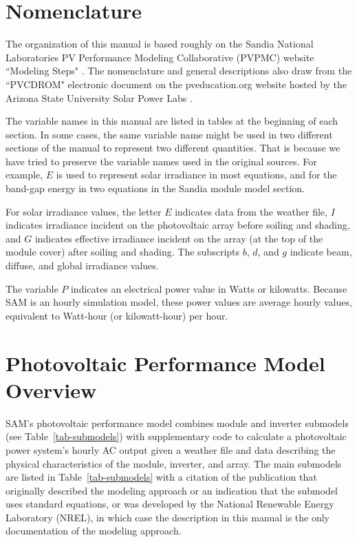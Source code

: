 \documentclass[12pt,letterpaper]{article}
\begin{document}
\mainmatter
\tableofcontents
\listoffigures
\listoftables

\chapter{Nomenclature}

The organization of this manual is based roughly on the Sandia National Laboratories PV Performance Modeling Collaborative (PVPMC) website ``Modeling Steps" \citep{pvpmc}. The nomenclature and general descriptions also draw from the ``PVCDROM" electronic document on the pveducation.org website hosted by the Arizona State University Solar Power Labs \citep{pvcdrom}.

The variable names in this manual are listed in tables at the beginning of each section. In some cases, the same variable name might be used in two different sections of the manual to represent two different quantities. That is because we have tried to preserve the variable names used in the original sources. For example, $E$ is used to represent solar irradiance in most equations, and for the band-gap energy in two equations in the Sandia module model section.

For solar irradiance values, the letter $E$ indicates data from the weather file, $I$ indicates irradiance incident on the photovoltaic array before soiling and shading, and $G$ indicates effective irradiance incident on the array (at the top of the module cover) after soiling and shading. The subscripts $b$, $d$, and $g$ indicate beam, diffuse, and global irradiance values.

The variable $P$ indicates an electrical power value in Watts or kilowatts. Because SAM is an hourly simulation model, these power values are average hourly values, equivalent to Watt-hour (or kilowatt-hour) per hour.

\chapter{Photovoltaic Performance Model Overview}

SAM's photovoltaic performance model combines module and inverter submodels (see Table~\ref{tab-submodels}) with supplementary code to calculate a photovoltaic power system's hourly AC output given a weather file and data describing the physical characteristics of the module, inverter, and array. The main submodels are listed in Table~\ref{tab-submodels} with a citation of the publication that originally described the modeling approach or an indication that the submodel uses standard equations, or was developed by the National Renewable Energy Laboratory (NREL), in which case the description in this manual is the only documentation of the modeling approach.
\end{document}
